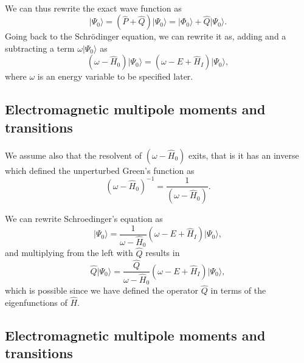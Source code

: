 \documentclass[%
twoside,                 %
final,                   %
10pt]{article}
\begin{document}
\paragraph{}
We can thus rewrite the exact wave function as
\[
\vert \Psi_0\rangle= (\hat{P}+\hat{Q})\vert \Psi_0\rangle=\vert \Phi_0\rangle+\hat{Q}\vert \Psi_0\rangle.
\]
Going back to the Schr\"odinger equation, we can rewrite it as, adding and a subtracting a term $\omega \vert \Psi_0\rangle$ as
\[
\left(\omega-\hat{H}_0\right)\vert \Psi_0\rangle=\left(\omega-E+\hat{H}_I\right)\vert \Psi_0\rangle,
\]
where $\omega$ is an energy variable to be specified later.



\subsection*{Electromagnetic multipole moments and transitions}

\paragraph{}
We assume also that the resolvent of $\left(\omega-\hat{H}_0\right)$ exits, that is
it has an inverse which defined the unperturbed Green's function as
\[
\left(\omega-\hat{H}_0\right)^{-1}=\frac{1}{\left(\omega-\hat{H}_0\right)}.
\]

We can rewrite Schroedinger's equation as
\[
\vert \Psi_0\rangle=\frac{1}{\omega-\hat{H}_0}\left(\omega-E+\hat{H}_I\right)\vert \Psi_0\rangle,
\]
and multiplying from the left with $\hat{Q}$ results in
\[
\hat{Q}\vert \Psi_0\rangle=\frac{\hat{Q}}{\omega-\hat{H}_0}\left(\omega-E+\hat{H}_I\right)\vert \Psi_0\rangle,
\]
which is possible since we have defined the operator $\hat{Q}$ in terms of the eigenfunctions of $\hat{H}$.



\subsection*{Electromagnetic multipole moments and transitions}

\end{document}
